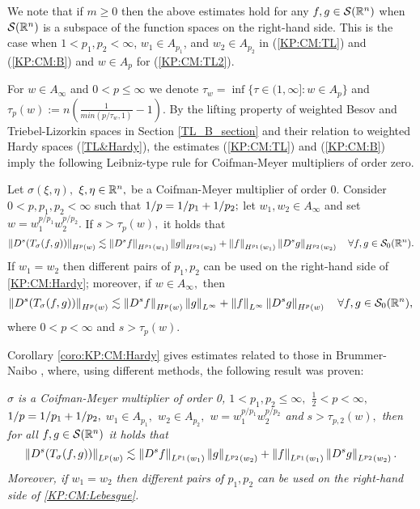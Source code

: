 {We note that if $m\geq 0$ then the above estimates hold for any $f,g\in{\mathcal{S}}({{\mathbb R}^n})$ when ${\mathcal{S}}({{\mathbb R}^n})$ is a subspace of the function spaces on the right-hand side. This is the case when $1<p_1,p_2<\infty$, $w_1\in A_{p_1}$, and $w_2\in A_{p_2}$ in (\ref{KP:CM:TL}) and (\ref{KP:CM:B}) and $w\in A_p$ for (\ref{KP:CM:TL2}). 

For $w \in A_\infty$ and $0<p\leq\infty$ we denote 
$\tau_w = \inf\{\tau\in(1,\infty]: w\in A_p\}$ and 
 $\tau_p(w) := n\left( \frac{1}{min(p/\tau_w,1)} - 1 \right).$  By the lifting property of weighted Besov and Triebel-Lizorkin spaces in Section \ref{TL_B_section} and their relation to weighted Hardy spaces (\ref{TL&Hardy}), the estimates (\ref{KP:CM:TL}) and (\ref{KP:CM:B}) imply the following Leibniz-type rule for Coifman-Meyer multipliers of order zero.

\begin{corollary}\label{coro:KP:CM:Hardy}  Let $\sigma(\xi,\eta),$ $\xi,\eta\in{{\mathbb R}^n},$ be a Coifman-Meyer multiplier of order $0.$ 
Consider  $0 < p, p_1, p_2  < \infty$  such that $1/p=1/p_1+1/p_2;$ let  $w_1,w_2\in A_\infty$ and set $w=w_1^{{p}/{p_1}} w_2^{{p}/{p_2}}.$ 
If  $s > \tau_p(w),$ it holds that
\begin{equation}\label{KP:CM:Hardy}
\left\|D^s(T_\sigma(f,g))\right\|_{H^p(w)} \lesssim \left\|D^s f\right\|_{H^{p_1}(w_1)} \left\|g\right\|_{H^{p_2}(w_2)} +  \left\|f\right\|_{H^{p_1}(w_1)}   \left\|D^s g\right\|_{H^{p_2}(w_2)} \quad \forall f, g \in {\mathcal{S}_0}({{\mathbb R}^n}).
\end{equation}
If $w_1=w_2$ then different pairs of $p_1, p_2$ can be used on the right-hand side of \eqref{KP:CM:Hardy}; moreover, if $w\in A_\infty,$ then 
\begin{equation}\label{Kp:CM:Hardy2}
\left\|D^s(T_\sigma(f,g))\right\|_{H^p(w)} \lesssim \left\|D^s f\right\|_{H^{p}(w)} \left\|g\right\|_{L^\infty} +  \left\|f\right\|_{L^\infty}   \left\|D^s g\right\|_{H^{p}(w)} \quad \forall f, g \in {\mathcal{S}_0}({{\mathbb R}^n}),
\end{equation}
where $0<p<\infty$ and $s>\tau_{p}(w).$

\end{corollary}

Corollary \ref{coro:KP:CM:Hardy} gives estimates related to those in Brummer-Naibo \cite{BrNa2017}, where, using different methods, the following result was proven:

\textit{$\sigma$ is a Coifman-Meyer multiplier of order 0, $1<p_1,p_2\le \infty,$ $\frac{1}{2}<p<\infty,$ $1/p=1/p_1+1/p_2,$  $w_1\in A_{p_1},$ $w_2\in A_{p_2},$ $w=w_1^{{p}/{p_1}} w_2^{{p}/{p_2}}$ and $s>\tau_{p,2}(w),$ then for all $f,g\in {\mathcal{S}}({{\mathbb R}^n})$ it holds that
\begin{equation}\label{KP:CM:Lebesgue}
\left\|D^s(T_\sigma(f,g))\right\|_{L^p(w)} \lesssim \left\|D^s f\right\|_{L^{p_1}(w_1)} \left\|g\right\|_{L^{p_2}(w_2)} +  \left\|f\right\|_{L^{p_1}(w_1)}   \left\|D^s g\right\|_{L^{p_2}(w_2)}. 
\end{equation}
Moreover, if $w_1=w_2$ then different pairs of $p_1, p_2$ can be used on the right-hand side of \eqref{KP:CM:Lebesgue}.
}

}
